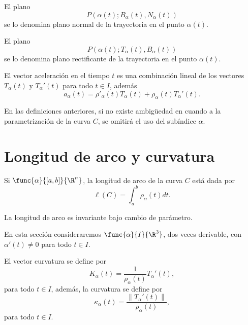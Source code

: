 \documentclass[a4,11pt]{aleph-notas}
\begin{document}
\begin{defi}
    El plano
    \[
        P(\alpha(t);B_\alpha(t),N_\alpha(t))
    \]
    se lo denomina plano normal de la trayectoria en el punto $\alpha(t)$.
\end{defi}

\begin{defi}
    El plano
    \[
        P(\alpha(t);T_\alpha(t),B_\alpha(t))
    \]
    se lo denomina plano rectificante de la trayectoria en el punto $\alpha(t)$.
\end{defi}
  

\begin{prop}
    El vector aceleración en el tiempo $t$ es una combinación lineal de los vectores $T_\alpha(t)$ y $T_\alpha'(t)$ para todo $t\in I$, además
    \[
        a_\alpha(t)=\rho'_\alpha(t) T_\alpha(t)+\rho_\alpha(t) T_\alpha' (t).
    \]
\end{prop}

\begin{advertencia}
    En las definiciones anteriores, si no existe ambigüedad en cuando a la parametrización de la curva $C$, se omitirá el uso del subíndice $\alpha$.
\end{advertencia}

\section{Longitud de arco y curvatura}

\begin{defi}
    Si $\func{\alpha}{[a,b]}{\R^n}$, la longitud de arco de la curva $C$ está dada por
    \[
        \ell(C)=\int_a^b \rho_\alpha(t) dt.
    \]
\end{defi}


\begin{prop}
    La longitud de arco es invariante bajo cambio de parámetro.
\end{prop}

En esta sección consideraremos $\func{\alpha}{I}{\R^3}$, dos veces derivable, con $\alpha'(t)\neq 0$ para todo $t\in I$.

\begin{defi}[Curvatura]
    El vector curvatura se define por
    \[
        K_\alpha(t)=\frac{1}{\rho_\alpha(t)}T_\alpha'(t),
    \]
    para todo $t\in I$, además, la curvatura se define por
    \[
        \kappa_\alpha(t)=\frac{\|T_\alpha'(t)\|}{\rho_\alpha(t)},
    \]
    para todo $t\in I$.
\end{defi}
\end{document}
